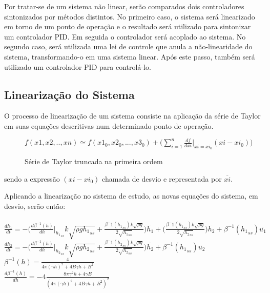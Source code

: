 Por tratar-se de um sistema não linear, serão comparados dois controladores sintonizados por métodos distintos. No primeiro caso, o sistema será linearizado em torno de um ponto de operação e o resultado será utilizado para sintonizar um controlador PID. Em seguida o controlador será acoplado ao sistema. No segundo caso, será utilizada uma lei de controle que anula a não-linearidade do sistema, transformando-o em uma sistema linear. Após este passo, também será utilizado um controlador PID para controlá-lo.

\subsection{Linearização do Sistema}

O processo de linearização de um sistema consiste na aplicação da série de Taylor em suas equações descritivas num determinado ponto de operação.

\begin{figure}[H]
	\centering
	$
	f(x1, x2, .. , xn) \simeq f(x1_0, x2_0, ..., x3_0) + \bigg( \sum_{i=1}^n \frac{df}{dxi}\big|_{xi=xi_0} (xi - xi_0) \bigg)
	$
	\caption{Série de Taylor truncada na primeira ordem}
\end{figure}

sendo a expressão $(xi - xi_0)$ chamada de desvio e representada por $\overline{xi}$.

Aplicando a linearização no sistema de estudo, as novas equações do sistema, em desvio, serão então:
\\\\
$
\frac{dh_1}{dt} = -\big(\frac{d\beta^{-1}(h)}{dh}\bigg|_{{h_1}_{ss}} k\sqrt{\rho g {h_1}_{ss}} + \frac{\beta^-1({h_1}_{ss}) k\sqrt{\rho g}}{2\sqrt{{h_1}_{ss}}}\big)\overline{h_1} + \big(\frac{\beta^-1({h_1}_{ss}) k\sqrt{\rho g}}{2\sqrt{{h_2}_{ss}}}\big)\overline{h_2} +  \beta^{-1}({h_1}_{ss})\overline{u_1}
$
\\
$
\frac{dh_2}{dt} = -\big(\frac{d\beta^{-1}(h)}{dh}\bigg|_{{h_2}_{ss}} k\sqrt{\rho g {h_2}_{ss}} + \frac{\beta^-1({h_2}_{ss}) k\sqrt{\rho g}}{2\sqrt{{h_2}_{ss}}}\big)\overline{h_2} + \beta^{-1}({h_1}_{ss})\overline{u_2}
$
\\
$
\beta^{-1}(h) = \frac{4}{4\pi(\gamma h)^2 + 4B\gamma h + B^2} 
$
\\
$
\frac{d\beta^{-1}(h)}{dh} = -4 \frac{8 \pi \gamma^2 h + 4 \gamma B}{(4\pi(\gamma h)^2 + 4B\gamma h + B^2)^2}
$

